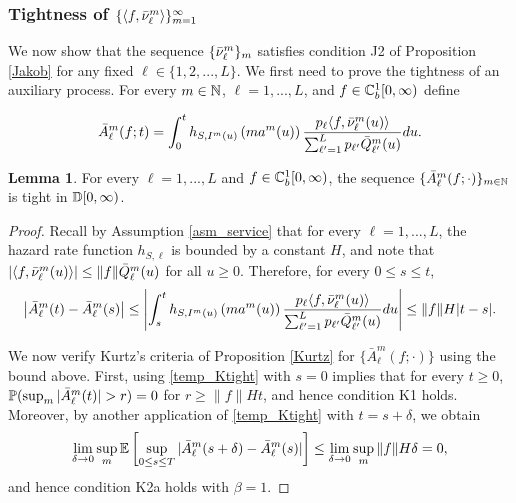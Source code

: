 \documentclass{article}
\theoremstyle{definition}
\newtheorem{lemma}[theorem]{Lemma}
\numberwithin{equation}{section}
\begin{document}
\subsubsection{Tightness of $\{\langle f,\bar{\nu}^m_\ell\rangle\}_{m=1}^\infty$}

We now show that the sequence $\{\bar{\nu}^m_\ell\}_m$ satisfies condition J2 of Proposition \ref{Jakob} for any fixed $\ell\in\{1,2,...,L\}$. We first need to prove the tightness of an auxiliary process. For every $m\in\mathbb{N}$, $\ell=1,...,L$, and $f\in\mathbb{C}_b^{1}[0,\infty)$ define

\begin{equation}\label{def_Am}
  \bar A^m_\ell(f;t)= \int_{0}^t h_{S,I^m(u)}\left(ma^m(u)\right) \frac{p_\ell \langle f,\bar{\nu}^m_\ell(u)\rangle}{\sum_{\ell'=1}^Lp_{\ell'}\bar {Q}^m_{\ell'}(u)} du.
\end{equation}

\begin{lemma}\label{lem_Atight}
For every $\ell=1,...,L$ and $f\in\mathbb{C}_b^{1}[0,\infty)$, the sequence $\{\bar A^m_\ell(f;\cdot)\}_{m\in\mathbb{N}}$ is tight in $\mathbb{D}[0,\infty)$.
\end{lemma}

\begin{proof}
Recall by Assumption \ref{asm_service} that for every $\ell=1,...,L$, the hazard rate function $h_{S,\ell}$ is bounded by a constant $H$, and note that $|\langle f,\bar{\nu}_\ell^m(u)\rangle| \leq \|f\| \bar {Q}^m_{\ell}(u)$ for all $u\geq0$. Therefore, for every $0\leq s\leq t$,
\begin{equation}\label{temp_Ktight}
\left|\bar A^m_\ell(t)-\bar A^m_\ell(s)\right| \leq \left|\int_s^t h_{S,I^m(u)}\left(ma^m(u)\right) \frac{p_\ell \langle f,\bar{\nu}^m_\ell(u)\rangle}{\sum_{\ell'=1}^Lp_{\ell'}\bar {Q}^m_{\ell'}(u)} du\right|\leq  \|f\| H |t-s|.
\end{equation}


We now verify Kurtz's criteria of Proposition \ref{Kurtz} for $\{\bar A^m_\ell(f;\cdot)\}$ using the bound above. First, using \eqref{temp_Ktight} with $s=0$ implies that for every $t\geq0$, $\Probil{\sup_m|\bar A^m_\ell(t)|>r}=0$ for $r\geq \|f\| H t$, and hence condition K1 holds. Moreover, by another application of \eqref{temp_Ktight} with $t=s+\delta$, we obtain
\[
\lim_{\delta\to0}\sup_m\mathbb{E}\left[\sup_{0\leq s\leq T}|\bar A_\ell^m(s+\delta)-\bar A_\ell^m(s)|\right] \leq \lim_{\delta\to0}\sup_m \|f\|H\delta =0,
\]
and hence condition K2a holds with $\beta=1$.
\end{proof}
\end{document}
